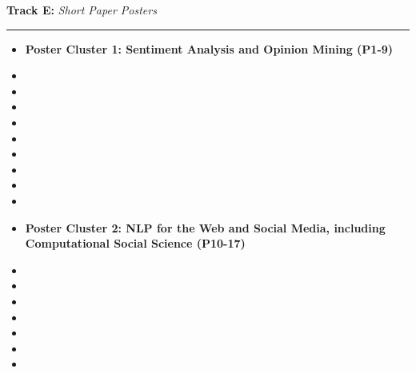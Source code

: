 \bigskip{}
\noindent \textbf{Track E:} \emph{Short Paper Posters} \hfill \emph{}\smallskip{}

\noindent \rule[0.5ex]{1\columnwidth}{1pt}
\begin{itemize}
\item []\textbf{Poster Cluster 1: Sentiment Analysis and Opinion Mining (P1-9)}
\item {}
\item {}
\item {}
\item {}
\item {}
\item {}
\item {}
\item {}
\item {}
\item []\textbf{Poster Cluster 2: NLP for the Web and Social Media, including Computational Social Science (P10-17)}
\item {}
\item {}
\item {}
\item {}
\item {}
\item {}
\item {}
\end{itemize}

\clearpage
